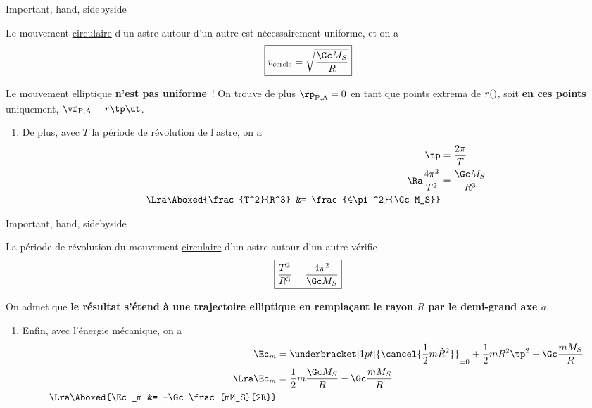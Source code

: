 \documentclass[../main/main.tex]{subfiles}
\begin{document}
\begin{tror}{Important, hand, sidebyside}
    \begin{center}
        \begin{bfseries}
            Le mouvement \ul{circulaire} d'un astre autour d'un autre
            est nécessairement uniforme, et on a
            \[\boxed{v_{\rm cercle} = \sqrt{\frac{\Gc M_S}{R}}}\]
        \end{bfseries}
    \end{center}
    \tcblower
    \danger Le mouvement elliptique \textbf{n'est pas uniforme}~! On trouve
    de plus $\rp_{\rm P,A} = 0$ en tant que points extrema de $r(\tt)$, soit
    \textbf{en ces points} uniquement, $\vf_{\rm P,A} = r\tp\ut$. \danger
\end{tror}
\begin{enumerate}[label=\sqenumi]
    \item[] De plus, avec $T$ la période de révolution de l'astre, on a
        \begin{align*}
            \tp &= \frac{2\pi}{T}
            \\\Ra
            \frac{4\pi^2}{T^2} &= \frac{\Gc M_S}{R^3}
            \\\Lra
            \Aboxed{\frac{T^2}{R^3} &= \frac{4\pi^2}{\Gc M_S}}
        \end{align*}
\end{enumerate}
\begin{tror}{Important, hand, sidebyside}
    \begin{center}
        \begin{bfseries}
            La période de révolution du mouvement \ul{circulaire} d'un astre
            autour d'un autre vérifie
            \[\boxed{\frac{T^2}{R^3} = \frac{4\pi^2}{\Gc M_S}}\]
        \end{bfseries}
    \end{center}
    \tcblower
    On admet que \textbf{le résultat s'étend à une trajectoire elliptique en
    remplaçant le rayon $R$ par le demi-grand axe $a$}.
\end{tror}
\begin{enumerate}[label=\sqenumi]
    \item[] Enfin, avec l'énergie mécanique, on a
        \begin{align*}
            \Ec_m &= \underbracket[1pt]{\cancel{\frac{1}{2}m\dot{R}^2}}_{=0} +
            \frac{1}{2}mR^2\tp^2 - \Gc\frac{mM_S}{R}
            \\\Lra
            \Ec_m &= \frac{1}{2}m\frac{\Gc M_S}{R} - \Gc\frac{mM_S}{R}
            \\\Lra
            \Aboxed{\Ec_m &= -\Gc\frac{mM_S}{2R}}
        \end{align*}
\end{enumerate}
\end{document}
